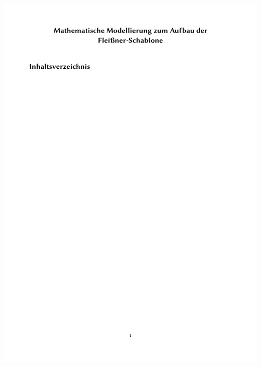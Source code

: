 \documentclass{beamer}
\begin{document}
\begin{frame}
\includegraphics[page=5, scale=0.25]{mathModell.pdf}
\end{frame}
\end{document}
